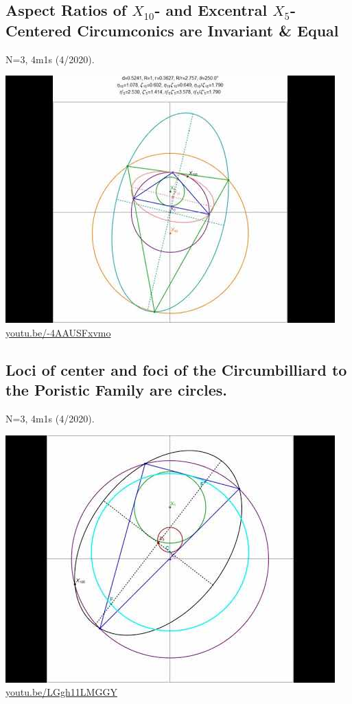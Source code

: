 \documentclass[12pt]{amsart}
\begin{document}
\subsection{Aspect Ratios of $X_{10}$- and Excentral $X_{5}$-Centered Circumconics are Invariant \& Equal}
\label{vid:-4AAUSFxvmo}
\noindent N=3, 4m1s (4/2020). 
\begin{center}\includegraphics[width=.5\textwidth]{pics/-4AAUSFxvmo.jpg} \\ 
\href{https://youtu.be/-4AAUSFxvmo}{\url{youtu.be/-4AAUSFxvmo}}\end{center}
% 

\subsection{Loci of center and foci of the Circumbilliard to the Poristic Family are circles.}
\label{vid:LGgh11LMGGY}
\noindent N=3, 4m1s (4/2020). 
\begin{center}\includegraphics[width=.5\textwidth]{pics/LGgh11LMGGY.jpg} \\ 
\href{https://youtu.be/LGgh11LMGGY}{\url{youtu.be/LGgh11LMGGY}}\end{center}
% 
\end{document}
